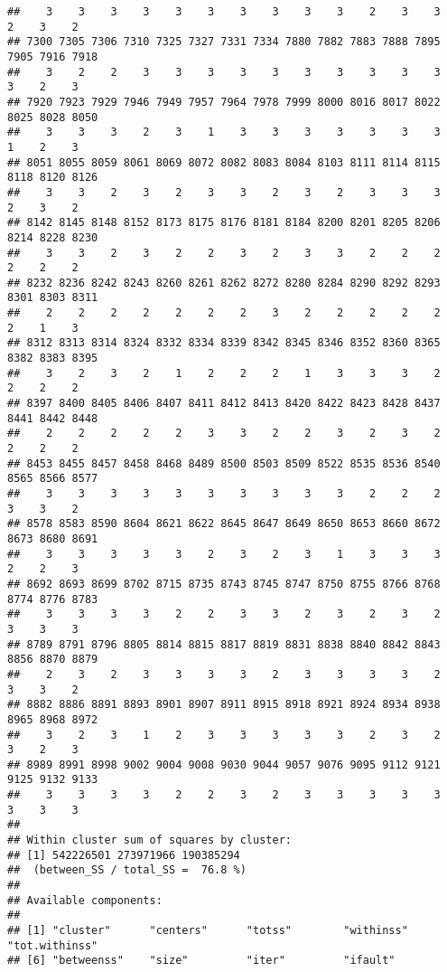 \documentclass[
]{article}
\begin{document}
\begin{verbatim}
##    3    3    3    3    3    3    3    3    3    3    2    3    3    2    3    2 
## 7300 7305 7306 7310 7325 7327 7331 7334 7880 7882 7883 7888 7895 7905 7916 7918 
##    3    2    2    3    3    3    3    3    3    3    3    3    3    3    2    3 
## 7920 7923 7929 7946 7949 7957 7964 7978 7999 8000 8016 8017 8022 8025 8028 8050 
##    3    3    3    2    3    1    3    3    3    3    3    3    3    1    2    3 
## 8051 8055 8059 8061 8069 8072 8082 8083 8084 8103 8111 8114 8115 8118 8120 8126 
##    3    3    2    3    2    3    3    2    3    2    3    3    3    2    3    2 
## 8142 8145 8148 8152 8173 8175 8176 8181 8184 8200 8201 8205 8206 8214 8228 8230 
##    3    3    2    3    2    2    3    2    3    3    2    2    2    2    2    2 
## 8232 8236 8242 8243 8260 8261 8262 8272 8280 8284 8290 8292 8293 8301 8303 8311 
##    2    2    2    2    2    2    2    3    2    2    2    2    2    2    1    3 
## 8312 8313 8314 8324 8332 8334 8339 8342 8345 8346 8352 8360 8365 8382 8383 8395 
##    3    2    3    2    1    2    2    2    1    3    3    3    2    2    2    2 
## 8397 8400 8405 8406 8407 8411 8412 8413 8420 8422 8423 8428 8437 8441 8442 8448 
##    2    2    2    2    2    3    3    2    2    3    2    3    2    2    2    2 
## 8453 8455 8457 8458 8468 8489 8500 8503 8509 8522 8535 8536 8540 8565 8566 8577 
##    3    3    3    3    3    3    3    3    3    3    2    2    2    3    3    2 
## 8578 8583 8590 8604 8621 8622 8645 8647 8649 8650 8653 8660 8672 8673 8680 8691 
##    3    3    3    3    3    2    3    2    3    1    3    3    3    2    2    3 
## 8692 8693 8699 8702 8715 8735 8743 8745 8747 8750 8755 8766 8768 8774 8776 8783 
##    3    3    3    3    2    2    3    3    2    3    2    3    2    3    3    3 
## 8789 8791 8796 8805 8814 8815 8817 8819 8831 8838 8840 8842 8843 8856 8870 8879 
##    2    3    2    3    3    3    3    2    3    3    3    3    2    3    3    2 
## 8882 8886 8891 8893 8901 8907 8911 8915 8918 8921 8924 8934 8938 8965 8968 8972 
##    3    2    3    1    2    3    3    3    3    3    2    3    2    3    2    3 
## 8989 8991 8998 9002 9004 9008 9030 9044 9057 9076 9095 9112 9121 9125 9132 9133 
##    3    3    3    3    2    2    3    2    3    3    3    3    3    3    3    3 
## 
## Within cluster sum of squares by cluster:
## [1] 542226501 273971966 190385294
##  (between_SS / total_SS =  76.8 %)
## 
## Available components:
## 
## [1] "cluster"      "centers"      "totss"        "withinss"     "tot.withinss"
## [6] "betweenss"    "size"         "iter"         "ifault"
\end{verbatim}
\end{document}
